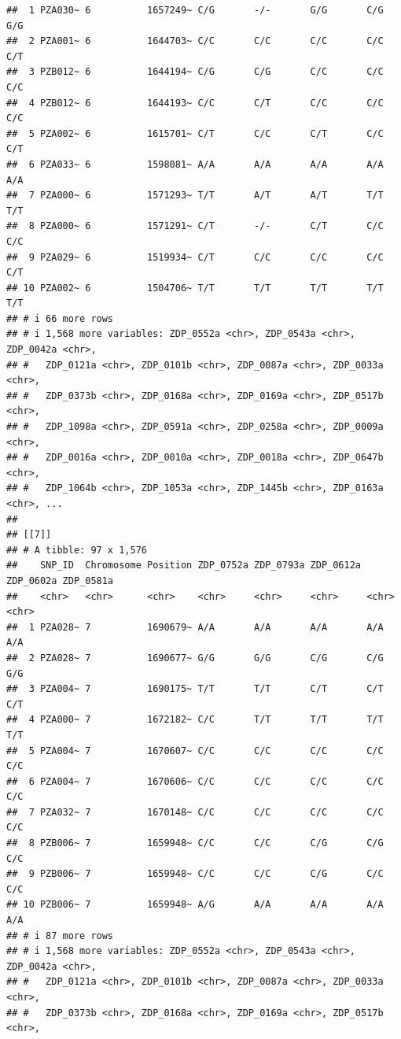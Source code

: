 \documentclass[
]{article}
\begin{document}
\begin{verbatim}
##  1 PZA030~ 6          1657249~ C/G       -/-       G/G       C/G       G/G      
##  2 PZA001~ 6          1644703~ C/C       C/C       C/C       C/C       C/T      
##  3 PZB012~ 6          1644194~ C/G       C/G       C/C       C/C       C/C      
##  4 PZB012~ 6          1644193~ C/C       C/T       C/C       C/C       C/C      
##  5 PZA002~ 6          1615701~ C/T       C/C       C/T       C/C       C/T      
##  6 PZA033~ 6          1598081~ A/A       A/A       A/A       A/A       A/A      
##  7 PZA000~ 6          1571293~ T/T       A/T       A/T       T/T       T/T      
##  8 PZA000~ 6          1571291~ C/T       -/-       C/T       C/C       C/C      
##  9 PZA029~ 6          1519934~ C/T       C/C       C/C       C/C       C/T      
## 10 PZA002~ 6          1504706~ T/T       T/T       T/T       T/T       T/T      
## # i 66 more rows
## # i 1,568 more variables: ZDP_0552a <chr>, ZDP_0543a <chr>, ZDP_0042a <chr>,
## #   ZDP_0121a <chr>, ZDP_0101b <chr>, ZDP_0087a <chr>, ZDP_0033a <chr>,
## #   ZDP_0373b <chr>, ZDP_0168a <chr>, ZDP_0169a <chr>, ZDP_0517b <chr>,
## #   ZDP_1098a <chr>, ZDP_0591a <chr>, ZDP_0258a <chr>, ZDP_0009a <chr>,
## #   ZDP_0016a <chr>, ZDP_0010a <chr>, ZDP_0018a <chr>, ZDP_0647b <chr>,
## #   ZDP_1064b <chr>, ZDP_1053a <chr>, ZDP_1445b <chr>, ZDP_0163a <chr>, ...
## 
## [[7]]
## # A tibble: 97 x 1,576
##    SNP_ID  Chromosome Position ZDP_0752a ZDP_0793a ZDP_0612a ZDP_0602a ZDP_0581a
##    <chr>   <chr>      <chr>    <chr>     <chr>     <chr>     <chr>     <chr>    
##  1 PZA028~ 7          1690679~ A/A       A/A       A/A       A/A       A/A      
##  2 PZA028~ 7          1690677~ G/G       G/G       C/G       C/G       G/G      
##  3 PZA004~ 7          1690175~ T/T       T/T       C/T       C/T       C/T      
##  4 PZA000~ 7          1672182~ C/C       T/T       T/T       T/T       T/T      
##  5 PZA004~ 7          1670607~ C/C       C/C       C/C       C/C       C/C      
##  6 PZA004~ 7          1670606~ C/C       C/C       C/C       C/C       C/C      
##  7 PZA032~ 7          1670148~ C/C       C/C       C/C       C/C       C/C      
##  8 PZB006~ 7          1659948~ C/C       C/C       C/G       C/G       C/C      
##  9 PZB006~ 7          1659948~ C/C       C/C       C/G       C/C       C/C      
## 10 PZB006~ 7          1659948~ A/G       A/A       A/A       A/A       A/A      
## # i 87 more rows
## # i 1,568 more variables: ZDP_0552a <chr>, ZDP_0543a <chr>, ZDP_0042a <chr>,
## #   ZDP_0121a <chr>, ZDP_0101b <chr>, ZDP_0087a <chr>, ZDP_0033a <chr>,
## #   ZDP_0373b <chr>, ZDP_0168a <chr>, ZDP_0169a <chr>, ZDP_0517b <chr>,

\end{verbatim}
\end{document}
